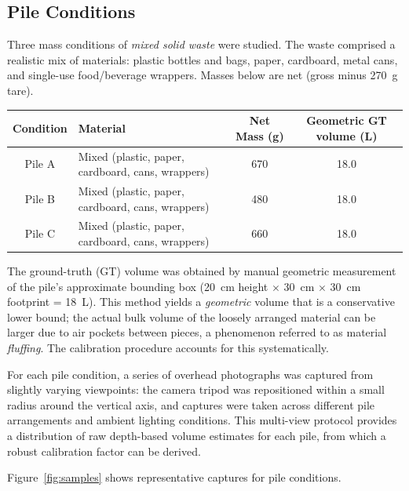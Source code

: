 \documentclass[11pt,a4paper]{article}
\begin{document}
\subsection{Pile Conditions}

Three mass conditions of \textit{mixed solid waste} were studied. The waste comprised a
realistic mix of materials: plastic bottles and bags, paper, cardboard, metal cans, and
single-use food/beverage wrappers. Masses below are net (gross minus 270~g tare).

\begin{center}
\renewcommand{\arraystretch}{1.3}
\begin{tabular}{@{}clcc@{}}
\toprule
\textbf{Condition} & \textbf{Material} & \textbf{Net Mass (g)} & \textbf{Geometric GT volume (L)} \\
\midrule
Pile A & Mixed (plastic, paper, cardboard, cans, wrappers) & 670 & 18.0 \\
Pile B & Mixed (plastic, paper, cardboard, cans, wrappers) & 480 & 18.0 \\
Pile C & Mixed (plastic, paper, cardboard, cans, wrappers) & 660 & 18.0 \\
\bottomrule
\end{tabular}
\end{center}

The ground-truth (GT) volume was obtained by manual geometric measurement of the pile's
approximate bounding box (20~cm height $\times$ 30~cm $\times$ 30~cm footprint = 18~L).
This method yields a \emph{geometric} volume that is a conservative lower bound; the actual
bulk volume of the loosely arranged material can be larger due to air pockets between pieces,
a phenomenon referred to as material \textit{fluffing}. The calibration procedure accounts
for this systematically.

For each pile condition, a series of overhead photographs was captured from slightly varying
viewpoints: the camera tripod was repositioned within a small radius around the vertical axis,
and captures were taken across different pile arrangements and ambient lighting conditions.
This multi-view protocol provides a distribution of raw depth-based volume estimates for
each pile, from which a robust calibration factor can be derived.

Figure~\ref{fig:samples} shows representative captures for pile conditions.
\end{document}
